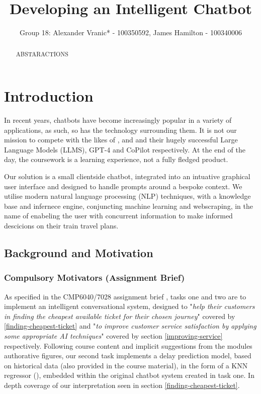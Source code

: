 \documentclass[11pt]{article}
\title{Developing an Intelligent Chatbot}
\author{Group 18: Alexander Vranic* - 100350592, James Hamilton - 100340006}
\begin{document}
\maketitle


\begin{abstract} \label{abstract}
    ABSTARACTIONS

\end{abstract}


\section{Introduction} \label{introduction}

In recent years, chatbots have become increasingly popular in a variety of applications, as such, so has the technology surrounding them. It is not our mission to compete with the likes of \cite{openai}, \cite{microsoft} and \cite{github} and their hugely successful Large Language Models (LLMS), GPT-4 \cite{gpt4} and CoPilot \cite{copilot} respectively. At the end of the day, the coursework is a learning experience, not a fully fledged product.

Our solution is a small clientside chatbot, integrated into an intuative graphical user interface and designed to handle prompts around a bespoke context. We utilise modern natural language processing (NLP) techniques, with a knowledge base and infernece engine, conjuncting machine learning and webscraping, in the name of enabeling the user with concurrent information to make informed descicions on their train travel plans.


\subsection{Background and Motivation} \label{background}

\subsubsection{Compulsory Motivators (Assignment Brief)} \label{compulsory-motivators}

As specified in the CMP6040/7028 assignment brief \cite{AI2018CW}, tasks one and two are to implement an intelligent conversational system, designed to "\textit{help their customers in finding the cheapest available ticket for their chosen journey}" covered by \ref{finding-cheapest-ticket} and "\textit{to improve customer service satisfaction by applying some appropriate AI techniques}" covered by section \ref{improving-service} respectively. Following course content and implicit suggestions from the modules authorative figures, our second task implements a delay prediction model, based on historical data (also provided in the course material), in the form of a KNN regressor (\cite{knn}), embedded within the original chatbot system created in task one. In depth coverage of our interpretation seen in section \ref{finding-cheapest-ticket}.
\end{document}
